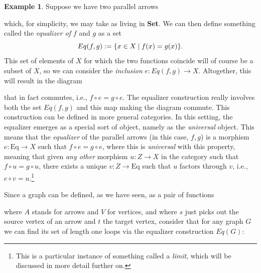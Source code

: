 \documentclass[11pt]{book}
\theoremstyle{definition}
\newtheorem{example}{Example}[section]
\theoremstyle{definition}
\theoremstyle{definition}
\theoremstyle{theorem}
\theoremstyle{definition}
\begin{document}
\begin{example}
	Suppose we have two parallel arrows 
	\begin{center}
	\end{center}
which, for simplicity, we may take as living in \textbf{Set}. We can then define something called the \textit{equalizer of} $f$ and $g$ as a set
	\begin{equation*}
	Eq(f,g) := \{x \in X \hspace*{0.25em}|\hspace*{0.25em} f(x) = g(x) \}. 
	\end{equation*}
	This set of elements of $X$ for which the two functions coincide will of course be a subset of $X$, so we can consider the \textit{inclusion} $e: Eq(f,g) \rightarrow X$. Altogether, this will result in the diagram
	\begin{center} 
	\end{center} 
that in fact commutes, i.e., $f \circ e = g \circ e$. The equalizer construction really involves both the set $Eq(f,g)$ and this map making the diagram commute. This construction can be defined in more general categories. In this setting, the equalizer emerges as a special sort of object, namely as the \textit{universal} object. This means that the \textit{equalizer} of the parallel arrows (in this case, $f, g$) is a morphism $e: \text{Eq} \rightarrow X$ such that $f \circ e = g \circ e$, where this is \textit{universal} with this property, meaning that given \textit{any other} morphism $u: Z \rightarrow X$ in the category such that $f \circ u = g \circ u$, there exists a unique $v: Z \rightarrow \text{Eq}$ such that $u$ factors through $v$, i.e., $e \circ v = u$.\footnote{This is a particular instance of something called a \textit{limit}, which will be discussed in more detail further on.}\par 
Since a graph can be defined, as we have seen, as a pair of functions  where $A$ stands for arrows and $V$ for vertices, and where $s$ just picks out the source vertex of an arrow and $t$ the target vertex, consider that for any graph $G$ we can find its set of length one loops via the equalizer construction $Eq(G)$:

\end{example}
\end{document}
